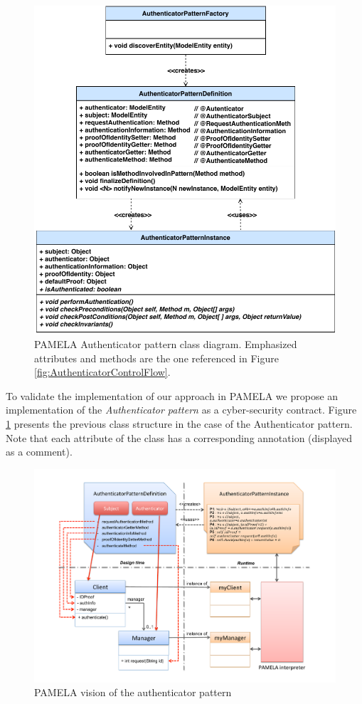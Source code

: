\begin{figure}
    \centering
    \includegraphics[width=0.8 \columnwidth]{utils/PAMELAAuthenticator_CD.pdf}
    \caption{PAMELA Authenticator pattern class diagram. Emphasized attributes and methods are the one referenced in Figure \ref{fig:AuthenticatorControlFlow}.}
    \label{fig:PAMELAAuthenticator_CD}
\end{figure}

To validate the implementation of our approach in PAMELA we propose an implementation of the \emph{Authenticator pattern} as a cyber-security contract. Figure \ref{fig:PAMELAAuthenticator_CD} presents the previous class structure in the case of the Authenticator pattern. Note that each attribute of the  class has a corresponding annotation (displayed as a comment).

\begin{figure}
    \centering
    \includegraphics[width=1.0 \columnwidth]{AuthenticatorPattern4.pdf}
    \caption{PAMELA vision of the authenticator pattern}
    \label{fig:AuthenticatorPattern}
\end{figure}

